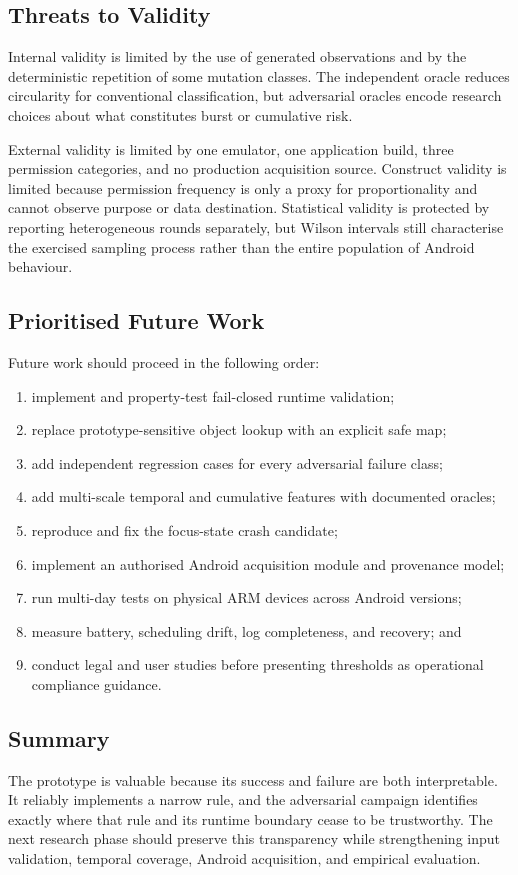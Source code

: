 \subsection{Threats to Validity}

Internal validity is limited by the use of generated observations and by the deterministic repetition of some mutation classes. The independent oracle reduces circularity for conventional classification, but adversarial oracles encode research choices about what constitutes burst or cumulative risk.

External validity is limited by one emulator, one application build, three permission categories, and no production acquisition source. Construct validity is limited because permission frequency is only a proxy for proportionality and cannot observe purpose or data destination. Statistical validity is protected by reporting heterogeneous rounds separately, but Wilson intervals still characterise the exercised sampling process rather than the entire population of Android behaviour.

\subsection{Prioritised Future Work}

Future work should proceed in the following order:

\begin{enumerate}
    \item implement and property-test fail-closed runtime validation;
    \item replace prototype-sensitive object lookup with an explicit safe map;
    \item add independent regression cases for every adversarial failure class;
    \item add multi-scale temporal and cumulative features with documented oracles;
    \item reproduce and fix the focus-state crash candidate;
    \item implement an authorised Android acquisition module and provenance model;
    \item run multi-day tests on physical ARM devices across Android versions;
    \item measure battery, scheduling drift, log completeness, and recovery; and
    \item conduct legal and user studies before presenting thresholds as operational compliance guidance.
\end{enumerate}

\subsection{Summary}

The prototype is valuable because its success and failure are both interpretable. It reliably implements a narrow rule, and the adversarial campaign identifies exactly where that rule and its runtime boundary cease to be trustworthy. The next research phase should preserve this transparency while strengthening input validation, temporal coverage, Android acquisition, and empirical evaluation.
